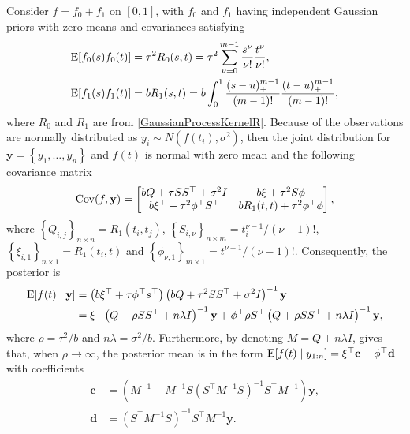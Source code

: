 Consider $f=f_0+f_1$ on $[0,1]$, with $f_0$ and $f_1$ having independent Gaussian priors with zero means and covariances satisfying  
\begin{align}
\mathrm{E} \lbrack f_0(s)f_0(t)\rbrack  &= \tau^2 R_0(s,t)=\tau^2 \sum_{\nu=0}^{m-1}\frac{s^\nu}{\nu!}\frac{t^\nu}{\nu!},\label{Ef0f0} \\
\mathrm{E} \lbrack f_1(s)f_1(t) \rbrack &= bR_1(s,t) = b\int_{0}^{1} \frac{(s-u)_+^{m-1}}{(m-1)!} \frac{(t-u)_+^{m-1}}{(m-1)!},\label{Ef1f1}
\end{align}
where $R_0$ and $R_1$ are from \eqref{GaussianProcessKernelR}. Because of the observations are normally distributed as $y_i\sim N(f(t_i),\sigma^2)$, then the joint distribution for $\mathbf{y} = \left\lbrace y_1,\ldots,y_n\right\rbrace$ and $f(t)$ is normal with zero mean and the following covariance matrix 
\begin{align}\mathrm{Cov} (f,\mathbf{y}) = 
\begin{bmatrix}
bQ+\tau SS^\top+\sigma^2 I & b\xi +\tau^2 S\phi \\
b\xi^\top + \tau^2\phi^\top S^\top & bR_1(t,t) +\tau^2\phi^\top \phi
\end{bmatrix},
\end{align}
where $\left\lbrace Q_{i,j}\right\rbrace_{n\times n}=R_1(t_i,t_j)$, $\left\lbrace S_{i,\nu}\right\rbrace_{n\times m}=t_i^{\nu-1}/(\nu-1)!$, $\left\lbrace \xi_{i,1}\right\rbrace_{n\times 1}=R_1(t_i,t)$ and $\left\lbrace \phi_{\nu,1}\right\rbrace_{m\times 1}=t^{\nu-1}/(\nu-1)!$. 
Consequently, the posterior is 
\begin{equation}
\begin{split}
\mathrm{E} \lbrack f(t)\mid\mathbf{y}\rbrack &= \left(b\xi^\top +\tau \phi^\top s^\top\right)\left(bQ+\tau^2 SS^\top+\sigma^2I\right)^{-1}\mathbf{y} \\
&= \xi^\top\left(Q+\rho SS^\top+n\lambda I\right)^{-1}\mathbf{y}+ \phi^\top\rho S^\top\left(Q+\rho SS^\top +n\lambda I\right)^{-1}\mathbf{y},
\end{split}
\end{equation}
where $\rho = \tau^2/b$ and $n\lambda=\sigma^2/b$. Furthermore, by denoting $M=Q+n\lambda I$, \cite{gu2013smoothing} gives that, when $\rho\rightarrow \infty$, the posterior mean is in the form $\mathrm{E}\lbrack f(t)\mid y_{1:n}\rbrack = \xi^\top\mathbf{c}+\phi^\top\mathbf{d}$ with coefficients
\begin{align}
\mathbf{c}&=\left(M^{-1}-M^{-1}S\left(S^\top M^{-1}S\right)^{-1}S^\top M^{-1}\right)\mathbf{y},\\
\mathbf{d}&=\left(S^\top M^{-1}S\right)^{-1}S^\top M^{-1}\mathbf{y}.
\end{align}

